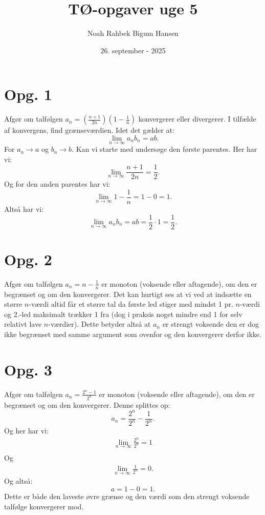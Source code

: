 \documentclass[12pt]{article}
\title{TØ-opgaver uge 5}
\author{Noah Rahbek Bigum Hansen}
\date{26. september - 2025}
\begin{document}
\maketitle

\section*{Opg. 1}
Afgør om talfølgen $a_n = \left( \frac{n+1}{2n} \right) \left( 1 - \frac{1}{n} \right) $ konvergerer eller divergerer.  I tilfælde af konvergens, find grænseværdien.
\bigbreak
Idet det gælder at:
\[
\lim_{n \to \infty} a_n b_n = ab
.\] 
For $a_n \to a$ og $b_n \to b$.
Kan vi starte med undersøge den første parentes. Her har vi:
\[
\lim_{n \to \infty} \frac{n+1}{2n} = \frac{1}{2}
.\] 
Og for den anden parentes har vi:
\[
\lim_{n \to \infty} 1 - \frac{1}{n} = 1 - 0 = 1
.\] 
Altså har vi:
\[
\lim_{n \to \infty} a_n b_n = ab = \frac{1}{2}\cdot 1 = \frac{1}{2}
.\] 

\section*{Opg. 2}
Afgør om talfølgen $a_n = n - \frac{1}{n}$ er monoton (voksende eller aftagende), om den er begrænset og om den konvergerer.
\bigbreak
Det kan hurtigt ses at vi ved at indsætte en større $n$-værdi altid får et større tal da første led stiger med mindst 1 pr. $n$-værdi og 2.-led maksimalt trækker 1 fra (dog i praksis noget mindre end 1 for selv relativt lave $n$-værdier). Dette betyder altså at $a_n$ er strengt voksende den er dog ikke begrænset med samme argument som ovenfor og den konvergerer derfor ikke.

\section*{Opg. 3}
Afgør om talfølgen $a_n = \frac{2^n-1}{2^n}$ er monoton (voksende eller aftagende), om den er begrænset og om den konvergerer.
\bigbreak
Denne splittes op:
\[
a_n = \frac{2^n}{2^n} - \frac{1}{2^n}
.\] 
Og her har vi:
\begin{align*}
  \lim_{n \to \infty} \frac{2^n}{2^n} = 1 \\
\end{align*}
  Og
\begin{align*}
  \lim_{n \to \infty} \frac{1}{2^n} = 0
.\end{align*}
Og altså:
\[
a = 1-0 = 1
.\] 
Dette er både den laveste øvre grænse og den værdi som den strengt voksende talfølge konvergerer mod.
\end{document}
